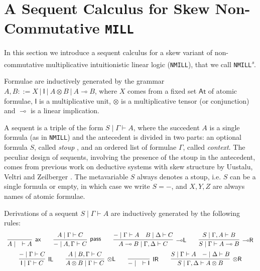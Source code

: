 \documentclass[submission,copyright,creativecommons]{eptcs}
\theoremstyle{definition}
\newtheorem{defn}{Definition}[section]
\newcommand{\tl}{\otimes \mathsf{L}}
\newcommand{\tr}{\otimes \mathsf{R}}
\newcommand{\lright}{{\multimap}\mathsf{R}}
\newcommand{\lleft}{{\multimap}\mathsf{L}}
\newcommand{\pass}{\mathsf{pass}}
\newcommand{\unitl}{\mathsf{IL}}
\newcommand{\unitr}{\mathsf{IR}}
\newcommand{\ax}{\mathsf{ax}}
\newcommand{\ot}{\otimes}
\newcommand{\lolli}{\multimap}
\newcommand{\I}{\mathsf{I}}
\newcommand{\MILL}{\texttt{MILL}}
\newcommand{\NMILL}{\texttt{NMILL}}
\newcommand{\SkNMILL}{\NMILL\textsuperscript{\textit{s}}}
\begin{document}
\section{A Sequent Calculus for Skew Non-Commutative \MILL}\label{sec2}
In this section we introduce a sequent calculus for a skew variant of non-commutative multiplicative intuitionistic linear logic (\NMILL), that we call \SkNMILL.

Formulae are inductively generated by the grammar $A,B ::= X \ | \ \I \ | \ A \ot B \ | \ A \lolli B$, where $X$ comes from a fixed set $\mathsf{At}$ of atomic formulae, $\I$ is a multiplicative unit, $\ot$ is a multiplicative tensor (or conjunction) and $\lolli$ is a linear implication.

A sequent is a triple of the form $S \mid \Gamma \vdash A$, where the succedent $A$ is a single formula (as in \NMILL) and the antecedent is divided in two parts: an optional formula $S$, called \emph{stoup} \cite{girard:constructive:91}, and an ordered list of formulae $\Gamma$, called \emph{context}. The peculiar design of sequents, involving the presence of the stoup in the antecedent, comes from previous work on deductive systems with skew structure by Uustalu, Veltri and Zeilberger \cite{uustalu:sequent:2021,uustalu:proof:nodate,uustalu:deductive:nodate,veltri:coherence:2021}.
The metavariable $S$ always denotes a stoup, i.e. $S$ can be a single formula or empty, in which case we write $S = -$, and $X,Y,Z$ are always names of atomic formulae.

Derivations of a sequent $S \mid \Gamma \vdash A$ are inductively generated by the following rules:
\begin{equation}\label{eq:seqcalc}
  \def\arraystretch{2.5}
  \begin{array}{c}
    \infer[\ax]{A \mid \quad \vdash A}{}
    \qquad
    \infer[\pass]{- \mid A , \Gamma \vdash C}{A \mid \Gamma \vdash C}
    \qquad
    \infer[\lleft]{A \lolli B \mid \Gamma , \Delta \vdash C}{
      - \mid \Gamma \vdash A
      &
      B \mid \Delta \vdash C
    }
    \qquad
    \infer[\lright]{S \mid \Gamma \vdash A \lolli B}{S \mid \Gamma , A \vdash B}
    \\
    \infer[\unitl]{\I \mid \Gamma \vdash C}{- \mid \Gamma \vdash C}
    \qquad
    \infer[\tl]{A \ot B \mid \Gamma \vdash C}{A \mid B , \Gamma \vdash C}
    \qquad
    \infer[\unitr]{- \mid \quad \vdash \I}{}
    \qquad
    \infer[\tr]{S \mid \Gamma , \Delta \vdash A \ot B}{
      S \mid \Gamma \vdash A
      &
      - \mid \Delta \vdash B
    }
  \end{array}
\end{equation}
\end{document}
